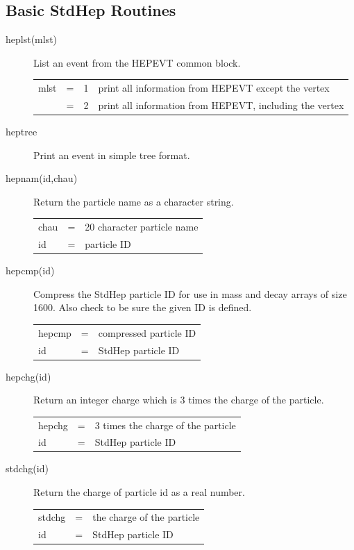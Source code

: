 \subsection{Basic StdHep Routines}

\begin{description}
\item[heplst(mlst) ] List an event from the HEPEVT common block.

\begin{tabular}{lcll}
mlst & = & 1 & print all information from HEPEVT except the vertex \\
     & = & 2 & print all information from HEPEVT, including the vertex \\
\end{tabular}

\item[heptree] Print an event in simple tree format.
\item[hepnam(id,chau) ] Return the particle name as a character string.

\begin{tabular}{lcl}
chau & = & 20 character particle name \\
id   & = & particle ID \\
\end{tabular}

\item[hepcmp(id)]
 Compress the StdHep particle ID for use in mass and decay arrays of
 size 1600.  Also check to be sure the given ID is defined.

\begin{tabular}{lcl}
hepcmp & = & compressed particle ID \\
id   & = & StdHep particle ID \\
\end{tabular}

\item[hepchg(id)]
 Return an integer charge which is 3 times the charge of the particle.

\begin{tabular}{lcl}
hepchg & = & 3 times the charge of the particle \\
id   & = & StdHep particle ID \\
\end{tabular}

\item[stdchg(id)]
 Return the charge of particle id as a real number.

\begin{tabular}{lcl}
stdchg & = & the charge of the particle \\
id   & = & StdHep particle ID \\
\end{tabular}


\end{description}
